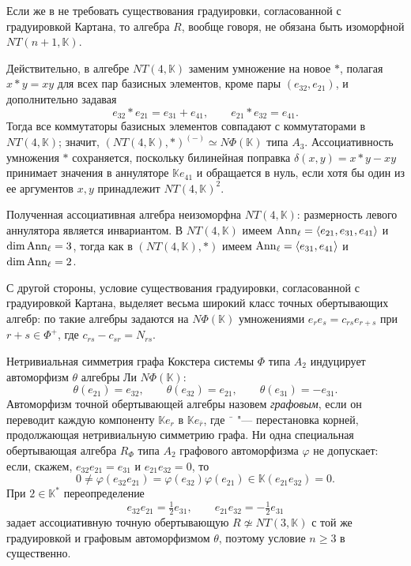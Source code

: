\documentclass[a4paper,14pt,oneside,openany]{memoir}
\begin{document}
\begin{remark}\label{remark:LieAdmissible-Nonunique-Assoc-A3}
    Если же в  не требовать существования градуировки,
    согласованной с градуировкой Картана, то алгебра $R$, вообще говоря, не обязана
    быть изоморфной $NT(n+1,\mathbb{K})$.

    Действительно, в алгебре $NT(4,\mathbb{K})$ заменим умножение на новое $\ast$,
    полагая $x\ast y=xy$ для всех пар базисных элементов, кроме пары
    $(e_{32},e_{21})$, и дополнительно задавая
    \[
        e_{32}\ast e_{21}=e_{31}+e_{41},\qquad e_{21}\ast e_{32}=e_{41}.
    \]
    Тогда все коммутаторы базисных элементов совпадают с коммутаторами в
    $NT(4,\mathbb{K})$; значит, $(NT(4,\mathbb{K}),\ast)^{(-)}\simeq
    N\Phi(\mathbb{K})$ типа $A_3$. Ассоциативность умножения $\ast$ сохраняется,
    поскольку билинейная поправка $\delta(x,y)=x\ast y-xy$ принимает значения в
    аннуляторе $\mathbb{K}e_{41}$ и обращается в нуль, если хотя бы один из ее
    аргументов $x,y$ принадлежит $NT(4,\mathbb{K})^2$.

    Полученная ассоциативная алгебра неизоморфна $NT(4,\mathbb{K})$: размерность
    левого аннулятора является инвариантом. В $NT(4,\mathbb{K})$ имеем
    $\operatorname{Ann}_{\ell}=\langle e_{21},e_{31},e_{41}\rangle$ и $\dim\operatorname{Ann}_{\ell}=3$, тогда
    как в $(NT(4,\mathbb{K}),\ast)$ имеем $\operatorname{Ann}_{\ell}=\langle
    e_{31},e_{41}\rangle$ и $\dim\operatorname{Ann}_{\ell}=2$.
\end{remark}

\begin{remark}\label{remark:graded-graph-auto}
    С другой стороны, условие существования градуировки, согласованной с
    градуировкой Картана, выделяет весьма широкий класс точных обертывающих алгебр:
    по  такие алгебры задаются на
    $N\Phi(\mathbb{K})$ умножениями $e_re_s=c_{rs}e_{r+s}$ при $r+s\in\Phi^+$, где
    $c_{rs}-c_{sr}=N_{rs}$.

    Нетривиальная симметрия графа Кокстера системы $\Phi$ типа $A_2$ индуцирует
    \cite[доказательство предложения~12.2.3]{carter72} автоморфизм $\theta$ алгебры
    Ли $N\Phi(\mathbb{K})$:
    \[
        \theta(e_{21})=e_{32}, \qquad \theta(e_{32})=e_{21}, \qquad
        \theta(e_{31})=-e_{31}.
    \]
    Автоморфизм точной обертывающей алгебры назовем \emph{графовым}, если он
    переводит каждую компоненту $\mathbb{K}e_r$ в $\mathbb{K}e_{\bar{r}}$, где
    $\bar{\phantom{r}}$ "--- перестановка корней, продолжающая нетривиальную
    симметрию графа. Ни одна специальная обертывающая алгебра $R_\Phi$ типа $A_2$
    графового автоморфизма $\varphi$ не допускает: если, скажем,
    $e_{32}e_{21}=e_{31}$ и $e_{21}e_{32}=0$, то
    \[
        0 \neq \varphi(e_{32}e_{21}) = \varphi(e_{32})\varphi(e_{21}) \in
        \mathbb{K}(e_{21}e_{32}) = 0.
    \]
    При $2\in\mathbb{K}^*$ переопределение
    \[
        e_{32}e_{21}=\tfrac{1}{2}e_{31}, \qquad e_{21}e_{32}=-\tfrac{1}{2}e_{31}
    \]
    задает ассоциативную точную обертывающую $R\not\simeq NT(3,\mathbb{K})$ с той
    же градуировкой и графовым автоморфизмом $\theta$, поэтому условие $n\geq3$ в
     существенно.
\end{remark}
\end{document}
